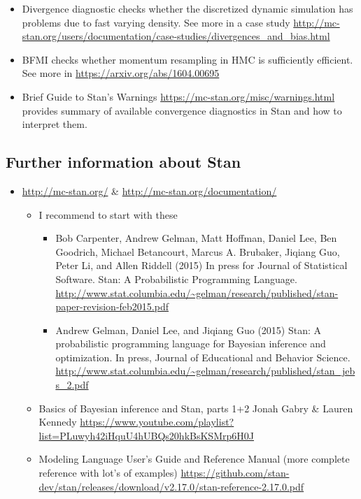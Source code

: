 \documentclass[a4paper,11pt,english]{article}
\begin{document}
\begin{itemize}
\item Divergence diagnostic checks whether the discretized dynamic
simulation has problems due to fast varying density. See more in a
case study
\url{http://mc-stan.org/users/documentation/case-studies/divergences_and_bias.html}
\item BFMI checks whether momentum resampling in HMC is sufficiently efficient. See more in
\url{https://arxiv.org/abs/1604.00695}
\item Brief Guide to Stan's Warnings
\url{https://mc-stan.org/misc/warnings.html} provides summary of
available convergence diagnostics in Stan and how to interpret them.
\end{itemize}

\subsection*{Further information about Stan}

\begin{itemize}
\item \url{http://mc-stan.org/} \& \url{http://mc-stan.org/documentation/}
  \begin{itemize}
  \item I recommend to start with these
    \begin{itemize}
    \item Bob Carpenter, Andrew Gelman, Matt Hoffman, Daniel Lee, Ben
      Goodrich, Michael Betancourt, Marcus A. Brubaker, Jiqiang Guo,
      Peter Li, and Allen Riddell (2015) In press for Journal of
      Statistical Software. Stan: A Probabilistic Programming
      Language. \url{http://www.stat.columbia.edu/~gelman/research/published/stan-paper-revision-feb2015.pdf}
    \item Andrew Gelman, Daniel Lee, and Jiqiang Guo (2015) Stan: A
      probabilistic programming language for Bayesian inference and
      optimization. In press, Journal of Educational and Behavior
      Science. \url{http://www.stat.columbia.edu/~gelman/research/published/stan_jebs_2.pdf}
    \end{itemize}
  \item Basics of Bayesian inference and Stan, parts 1+2 Jonah Gabry \& Lauren Kennedy \url{https://www.youtube.com/playlist?list=PLuwyh42iHquU4hUBQs20hkBsKSMrp6H0J}
  \item Modeling Language User's Guide and Reference Manual (more complete reference with lot's of examples) \url{https://github.com/stan-dev/stan/releases/download/v2.17.0/stan-reference-2.17.0.pdf}
  \end{itemize}
\end{itemize}
\end{document}
